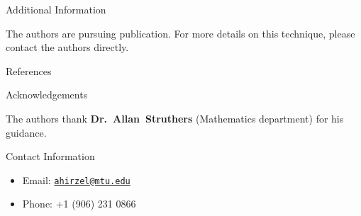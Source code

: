 \documentclass[final]{beamer}
\newlength{\onecolwid}
\begin{document}
\begin{frame}[t]
\begin{columns}[t]
\begin{column}{\onecolwid}
\begin{block}{Additional Information}

The authors are pursuing publication. For more details on this technique, please
contact the authors directly.

\end{block}


\begin{block}{References}

\nocite{*} %
\small{
\vspace{0.75in}}

\end{block}



\begin{block}{Acknowledgements}

The authors thank \textbf{Dr.~Allan~Struthers} (Mathematics
department) for his guidance.

\end{block}



\begin{block}{Contact Information}

\begin{itemize}
\item Email: \href{mailto:ahirzel@mtu.edu}{\texttt{ahirzel@mtu.edu}}
\item Phone: +1 (906) 231 0866
\end{itemize}


\end{block}
\end{column}
\end{columns}
\end{frame}
\end{document}
